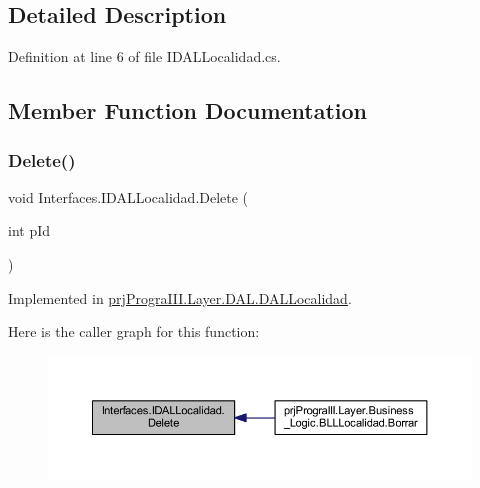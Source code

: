 \subsection{Detailed Description}


Definition at line 6 of file I\+D\+A\+L\+Localidad.\+cs.



\subsection{Member Function Documentation}
\hypertarget{interface_interfaces_1_1_i_d_a_l_localidad_ad010ce72d666cd1a2f7493b0c75c4b66}{}\label{interface_interfaces_1_1_i_d_a_l_localidad_ad010ce72d666cd1a2f7493b0c75c4b66} 
\subsubsection{\texorpdfstring{Delete()}{Delete()}}
{\footnotesize\ttfamily void Interfaces.\+I\+D\+A\+L\+Localidad.\+Delete (\begin{DoxyParamCaption}\item[{int}]{p\+Id }\end{DoxyParamCaption})}



Implemented in \hyperlink{classprj_progra_i_i_i_1_1_layer_1_1_d_a_l_1_1_d_a_l_localidad_a10941dad044a07cd5611800e08db6f44}{prj\+Progra\+I\+I\+I.\+Layer.\+D\+A\+L.\+D\+A\+L\+Localidad}.

Here is the caller graph for this function\+:
\nopagebreak
\begin{figure}[H]
\begin{center}
\leavevmode
\includegraphics[width=350pt]{interface_interfaces_1_1_i_d_a_l_localidad_ad010ce72d666cd1a2f7493b0c75c4b66_icgraph}
\end{center}
\end{figure}
\hypertarget{interface_interfaces_1_1_i_d_a_l_localidad_afc7b2ff5ab6188af4b0c9c1f77961a6c}{}\label{interface_interfaces_1_1_i_d_a_l_localidad_afc7b2ff5ab6188af4b0c9c1f77961a6c} 
